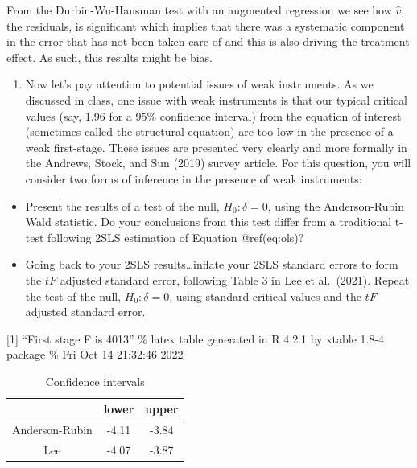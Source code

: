 \documentclass[
  12pt,
]{article}
\providecommand{\tightlist}{%
  \setlength{\itemsep}{0pt}\setlength{\parskip}{0pt}}
\begin{document}
From the Durbin-Wu-Hausman test with an augmented regression we see how
\(\hat{v}\), the residuals, is significant which implies that there was
a systematic component in the error that has not been taken care of and
this is also driving the treatment effect. As such, this results might
be bias.

\begin{enumerate}
\def\labelenumi{\arabic{enumi}.}
\setcounter{enumi}{6}
\tightlist
\item
  Now let's pay attention to potential issues of weak instruments. As we
  discussed in class, one issue with weak instruments is that our
  typical critical values (say, 1.96 for a 95\% confidence interval)
  from the equation of interest (sometimes called the structural
  equation) are too low in the presence of a weak first-stage. These
  issues are presented very clearly and more formally in the Andrews,
  Stock, and Sun (2019) survey article. For this question, you will
  consider two forms of inference in the presence of weak instruments:
\end{enumerate}

\begin{itemize}
\tightlist
\item
  Present the results of a test of the null, \(H_{0}: \delta=0\), using
  the Anderson-Rubin Wald statistic. Do your conclusions from this test
  differ from a traditional t-test following 2SLS estimation of Equation
  @ref(eq:ols)?
\item
  Going back to your 2SLS results\ldots inflate your 2SLS standard
  errors to form the \(tF\) adjusted standard error, following Table 3
  in Lee et al.~(2021). Repeat the test of the null,
  \(H_{0}: \delta=0\), using standard critical values and the \(tF\)
  adjusted standard error.
\end{itemize}

{[}1{]} ``First stage F is 4013'' \% latex table generated in R 4.2.1 by
xtable 1.8-4 package \% Fri Oct 14 21:32:46 2022

\begin{table}[ht]
\centering
\begin{tabular}{ccc}
  \hline
 & lower & upper \\ 
  \hline
Anderson-Rubin & -4.11 & -3.84 \\ 
  Lee & -4.07 & -3.87 \\ 
   \hline
\end{tabular}
\caption{Confidence intervals} 
\label{tab:ci}
\end{table}
\end{document}
